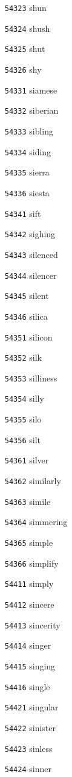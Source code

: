 \documentclass[twoside,11pt]{article}
\begin{document}
\begin{multicols}{5}
\begin{enumerate}
\item[\texttt{54323}] shun
\item[\texttt{54324}] shush
\item[\texttt{54325}] shut
\item[\texttt{54326}] shy
\item[\texttt{54331}] siamese
\item[\texttt{54332}] siberian
\item[\texttt{54333}] sibling
\item[\texttt{54334}] siding
\item[\texttt{54335}] sierra
\item[\texttt{54336}] siesta
\item[\texttt{54341}] sift
\item[\texttt{54342}] sighing
\item[\texttt{54343}] silenced
\item[\texttt{54344}] silencer
\item[\texttt{54345}] silent
\item[\texttt{54346}] silica
\item[\texttt{54351}] silicon
\item[\texttt{54352}] silk
\item[\texttt{54353}] silliness
\item[\texttt{54354}] silly
\item[\texttt{54355}] silo
\item[\texttt{54356}] silt
\item[\texttt{54361}] silver
\item[\texttt{54362}] similarly
\item[\texttt{54363}] simile
\item[\texttt{54364}] simmering
\item[\texttt{54365}] simple
\item[\texttt{54366}] simplify
\item[\texttt{54411}] simply
\item[\texttt{54412}] sincere
\item[\texttt{54413}] sincerity
\item[\texttt{54414}] singer
\item[\texttt{54415}] singing
\item[\texttt{54416}] single
\item[\texttt{54421}] singular
\item[\texttt{54422}] sinister
\item[\texttt{54423}] sinless
\item[\texttt{54424}] sinner

\end{enumerate}
\end{multicols}
\end{document}

